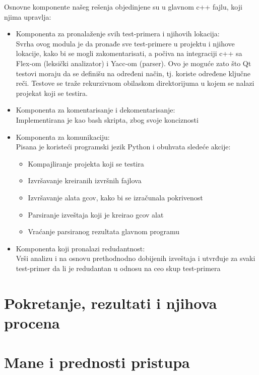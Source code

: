 \documentclass[a4paper]{article}
\theoremstyle{definition}
\begin{document}
Osnovne komponente našeg rešenja objedinjene su u glavnom c++ fajlu, koji njima upravlja:
\begin{itemize}
    \item Komponenta za pronalaženje svih test-primera i njihovih lokacija:\\
            Svrha ovog modula je da pronađe sve test-primere u projektu i njihove lokacije, kako bi se mogli zakomentarisati, a počiva na integraciji c++ sa Flex-om (leksički analizator) i Yacc-om (parser). Ovo je moguće zato što Qt testovi moraju da se definišu na određeni način, tj. koriste određene ključne reči. Testove se traže rekurzivnom obilaskom direktorijuma u kojem se nalazi projekat koji se testira.
    \item Komponenta za komentarisanje i dekomentarisanje:\\
            Implementirana je kao bash skripta, zbog svoje konciznosti
    \item Komponenta za komunikaciju:\\
            Pisana je koristeći programski jezik Python i obuhvata sledeće akcije:
            \begin{itemize}
                \item Kompajliranje projekta koji se testira
                \item Izvršavanje kreiranih izvršnih fajlova
                \item Izvršavanje alata gcov, kako bi se izračunala pokrivenost
                \item Parsiranje izveštaja koji je kreirao gcov alat
                \item Vraćanje parsiranog rezultata glavnom programu
            \end{itemize}
    \item Komponenta koji pronalazi redudantnost:\\
            Vrši analizu i na osnovu prethodnodno dobijenih izveštaja i utvrđuje za svaki test-primer da li je redudantan u odnosu na ceo skup test-primera
\end{itemize}

\section{Pokretanje, rezultati i njihova procena}
\label{sec:rezultati}

\section{Mane i prednosti pristupa}
\label{sec:mane}
\end{document}
